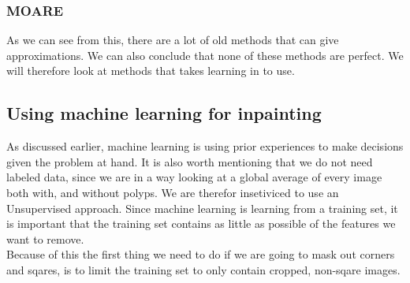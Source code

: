     \subsubsection{MOARE}
	
    As we can see from this, there are a lot of old methods that can give approximations. We can also conclude that none of these methods are perfect.
    We will therefore look at methods that takes learning in to use.
  \subsection{Using machine learning for inpainting}
    As discussed earlier, machine learning is using prior experiences to make decisions given the problem at hand. 
    It is also worth mentioning that we do not need labeled data, since we are in a way looking at a global average of every image both with, and without polyps. We are therefor insetiviced to use an 
    Unsupervised approach.
    Since machine learning is learning from a training set, it is important that the training set contains as little as possible of the features we want to remove. \\
    
    Because of this the first thing we need to do if we are going to mask out corners and sqares, is to limit the training set to only contain cropped, non-sqare images. 
 
